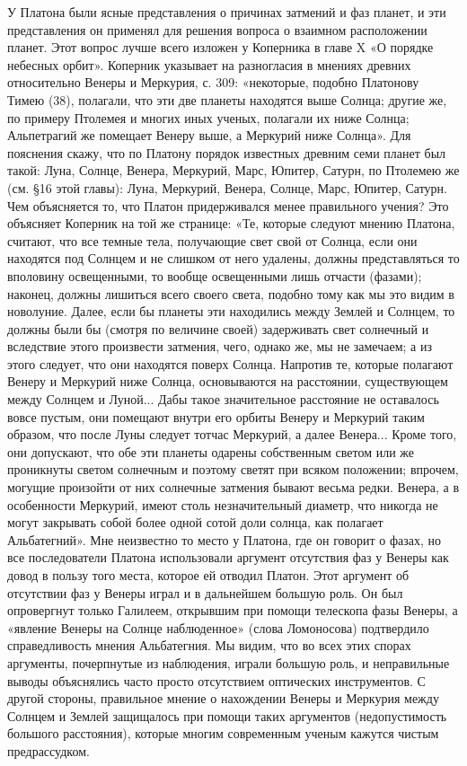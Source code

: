 У Платона были ясные представления о причинах затмений и фаз планет, и
эти представления он применял для решения вопроса о взаимном
расположении планет. Этот вопрос лучше всего изложен у Коперника в
главе X «О порядке небесных орбит». Коперник указывает на разногласия
в мнениях древних относительно Венеры и Меркурия, с. 309: «некоторые,
подобно Платонову Тимею (38), полагали, что эти две планеты находятся
выше Солнца; другие же, по примеру Птолемея и многих иных ученых,
полагали их ниже Солнца; Альпетрагий же помещает Венеру выше, а
Меркурий ниже Солнца». Для пояснения скажу, что по Платону порядок
известных древним семи планет был такой: Луна, Солнце, Венера,
Меркурий, Марс, Юпитер, Сатурн, по Птолемею же (см. §16 этой главы):
Луна, Меркурий, Венера, Солнце, Марс, Юпитер, Сатурн. Чем объясняется
то, что Платон придерживался менее правильного учения? Это объясняет
Коперник на той же странице: «Те, которые следуют мнению Платона,
считают, что все темные тела, получающие свет свой от Солнца, если они
находятся под Солнцем и не слишком от него удалены, должны
представляться то вполовину освещенными, то вообще освещенными лишь
отчасти (фазами); наконец, должны лишиться всего своего света, подобно
тому как мы это видим в новолуние. Далее, если бы планеты эти
находились между Землей и Солнцем, то должны были бы (смотря по
величине своей) задерживать свет солнечный и вследствие этого
произвести затмения, чего, однако же, мы не замечаем; а из этого
следует, что они находятся поверх Солнца. Напротив те, которые
полагают Венеру и Меркурий ниже Солнца, основываются на расстоянии,
существующем между Солнцем и Луной... Дабы такое значительное
расстояние не оставалось вовсе пустым, они помещают внутри его орбиты
Венеру и Меркурий таким образом, что после Луны следует тотчас
Меркурий, а далее Венера... Кроме того, они допускают, что обе эти
планеты одарены собственным светом или же проникнуты светом солнечным
и поэтому светят при всяком положении; впрочем, могущие произойти от
них солнечные затмения бывают весьма редки. Венера, а в особенности
Меркурий, имеют столь незначительный диаметр, что никогда не могут
закрывать собой более одной сотой доли солнца, как полагает
Альбатегний». Мне неизвестно то место у Платона, где он говорит о
фазах, но все последователи Платона использовали аргумент отсутствия
фаз у Венеры как довод в пользу того места, которое ей отводил Платон.
Этот аргумент об отсутствии фаз у Венеры играл и в дальнейшем большую
роль. Он был опровергнут только Галилеем, открывшим при помощи
телескопа фазы Венеры, а «явление Венеры на Солнце наблюденное» (слова
Ломоносова) подтвердило справедливость мнения Альбатегния. Мы видим,
что во всех этих спорах аргументы, почерпнутые из наблюдения, играли
большую роль, и неправильные выводы объяснялись часто просто
отсутствием оптических инструментов. С другой стороны, правильное
мнение о нахождении Венеры и Меркурия между Солнцем и Землей
защищалось при помощи таких аргументов (недопустимость большого
расстояния), которые многим современным ученым кажутся чистым
предрассудком.


